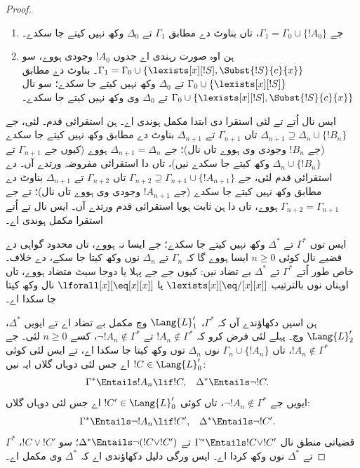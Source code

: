 \documentclass[../../../include/open-logic-section]{subfiles}
\begin{document}
\begin{proof}
\begin{enumerate}
   صرف 
  اے؛
\item جے $\Gamma_1 = \Gamma_0 \cup\{ !A_0\}$،
  تاں بناوٹ دے مطابق $\Gamma_1$ تے
  $\Delta_0$ وکھ نہیں کیتے جا سکدے۔
\item ہن اوہ صورت رہندی اے جدوں $!A_0$
  وجودی ہووے، سو
  $\Gamma_1 = \Gamma_0 \cup \{ \lexists[x][!S], \Subst{!S}{c}{x}
  \}$۔ بناوٹ دے مطابق
  $\Gamma_0 \cup \{ \lexists[x][!S]\}$
  تے $\Delta_0$ وکھ نہیں کیتے جا سکدے؛
  سو  نال
  $\Gamma_0 \cup \{ \lexists[x][!S], \Subst{!S}{c}{x} \}$
  تے $\Delta_0$ وی وکھ نہیں کیتے جا سکدے۔
\end{enumerate}
ایس نال اُتے  تے
 لئی استقرا دی ابتدا
مکمل ہوندی اے۔ ہن استقرائی قدم۔
 لئی، جے
$\Delta_{n+1} \supseteq \Delta_n \cup \{ !B_n \}$
تاں $\Gamma_{n+1}$ تے
$\Delta_{n+1}$ بناوٹ دے مطابق وکھ
نہیں کیتے جا سکدے (جے $!B_n$
وجودی وی ہووے تاں
 نال)؛ جے
$\Delta_{n+1} = \Delta_n$ ہووے
(کیوں جے $\Gamma_{n+1}$ تے
$\Delta_n \cup \{!B_n\}$ وکھ کیتے
جا سکدے نیں)، تاں
 دا استقرائی مفروضہ ورتدے
آں۔  دے استقرائی قدم لئی،
جے $\Gamma_{n+2} \supseteq \Gamma_{n+1} \cup
\{!A_{n+1} \}$ تاں $\Gamma_{n+2}$
تے $\Delta_{n+1}$ بناوٹ دے مطابق
وکھ نہیں کیتے جا سکدے (جے $!A_{n+1}$
وجودی وی ہووے تاں
 نال)؛ تے جے
$\Gamma_{n+2} = \Gamma_{n+1}$ ہووے،
تاں  دا ہن ثابت ہویا
استقرائی قدم ورتدے آں۔ ایس نال
 تے 
اُتے استقرا مکمل ہوندی اے۔

ایس توں $\Gamma^*$ تے $\Delta^*$
وکھ نہیں کیتے جا سکدے؛ جے ایسا نہ
ہووے، تاں محدود گواہی دے قضیے نال
کوئی $n \ge 0$ ایسا ہووے گا کہ
$\Gamma_n$ تے $\Delta_n$ نوں
وکھ کیتا جا سکے،  دے خلاف۔
خاص طور اُتے $\Gamma^*$ تے
$\Delta^*$ بے تضاد نیں: کیوں جے جے
پہلا یا دوجا سیٹ متضاد ہووے، تاں
اوہناں نوں بالترتیب
$\lexists[x][\eq/[x][x]]$ یا
  $\lforall[x][\eq[x][x]]$
نال وکھ کیتا جا سکدا اے۔

ہن اسیں دکھاؤندے آں کہ $\Gamma^*$،
$\Lang{L}'_1$ وچ مکمل بے تضاد اے
تے ایویں $\Delta^*$،
$\Lang{L}'_2$ وچ۔ پہلے لئی فرض کرو
کہ $!A_n \notin \Gamma^*$ تے
$\lnot !A_n
\notin \Gamma^*$، کسے
$n \ge 0$ لئی۔ جے
$!A_n \notin \Gamma^*$،
تاں $\Gamma_n \cup \{!A_n \}$
نوں $\Delta_n$ توں وکھ کیتا
جا سکدا اے، تے ایس لئی کوئی
$!C \in \Lang{L}'_0$ اے جس لئی
دوہاں گلاں ایہ نیں:
\begin{align*}
  \Gamma^* & \Entails !A_n \lif !C, & 
  \Delta^* & \Entails \lnot !C.
\end{align*}
ایویں جے $\lnot !A_n \notin \Gamma^*$،
تاں کوئی $!C' \in
\Lang{L}'_0$ اے جس لئی دوہاں گلاں:
\begin{align*}
  \Gamma^* & \Entails \lnot !A_n \lif !C', & 
  \Delta^* & \Entails \lnot !C'.
\end{align*}
قضیاتی منطق نال
$\Gamma^* \Entails !C \lor !C'$ تے
$\Delta^* \Entails \lnot (!C \lor !C')$؛
سو $!C \lor
!C'$، $\Gamma^*$ تے $\Delta^*$
نوں وکھ کردا اے۔ ایس ورگی دلیل
دکھاؤندی اے کہ $\Delta^*$ وی مکمل اے۔


\end{proof}
\end{document}
